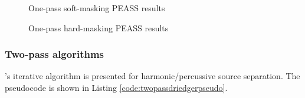 \documentclass[10pt,letter]{article}
\begin{document}
\begin{figure}
	\centering
	\vspace{-0.8em}
	\vspace{-1.25em}
	\caption{One-pass soft-masking PEASS results}
	\label{fig:round1soft}
\end{figure}

\begin{figure}
	\centering
	\vspace{-0.8em}
	\vspace{-1.25em}
	\caption{One-pass hard-masking PEASS results}
	\label{fig:round1hard}
\end{figure}

\subsubsection{Two-pass algorithms}

\citet{driedger}'s iterative algorithm is presented for harmonic/percussive source separation. The pseudocode is shown in Listing \ref{code:twopassdriedgerpseudo}.
\end{document}
